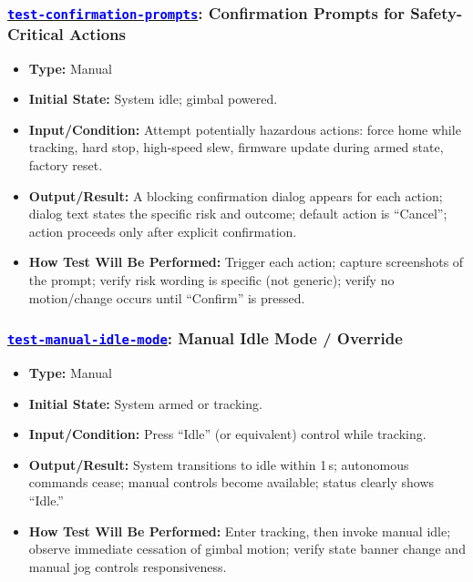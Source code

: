 \documentclass[12pt, titlepage]{article}
\newcommand{\tid}[1]{\hyperlink{tid:#1}{\textcolor{blue}{\texttt{#1}}}}
\begin{document}
\subsubsection*{\tid{test-confirmation-prompts}: Confirmation Prompts for Safety-Critical Actions}
\begin{itemize}
  \item \textbf{Type:} Manual
  \item \textbf{Initial State:} System idle; gimbal powered.
  \item \textbf{Input/Condition:} Attempt potentially hazardous actions: force home while tracking, hard stop, high-speed slew, firmware update during armed state, factory reset.
  \item \textbf{Output/Result:} A blocking confirmation dialog appears for each action; dialog text states the specific risk and outcome; default action is “Cancel”; action proceeds only after explicit confirmation.
  \item \textbf{How Test Will Be Performed:} Trigger each action; capture screenshots of the prompt; verify risk wording is specific (not generic); verify no motion/change occurs until “Confirm” is pressed.
\end{itemize}

\subsubsection*{\tid{test-manual-idle-mode}: Manual Idle Mode / Override}
\begin{itemize}
  \item \textbf{Type:} Manual
  \item \textbf{Initial State:} System armed or tracking.
  \item \textbf{Input/Condition:} Press “Idle” (or equivalent) control while tracking.
  \item \textbf{Output/Result:} System transitions to idle within 1\,s; autonomous commands cease; manual controls become available; status clearly shows “Idle.”
  \item \textbf{How Test Will Be Performed:} Enter tracking, then invoke manual idle; observe immediate cessation of gimbal motion; verify state banner change and manual jog controls responsiveness.
\end{itemize}
\end{document}

